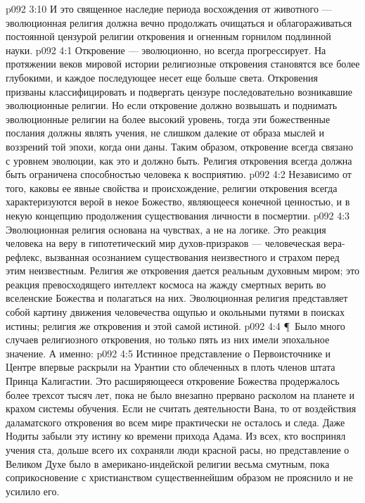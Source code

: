 \vs p092 3:10 И это священное наследие периода восхождения от животного --- эволюционная религия должна вечно продолжать очищаться и облагораживаться постоянной цензурой религии откровения и огненным горнилом подлинной науки.
\vs p092 4:1 Откровение --- эволюционно, но всегда прогрессирует. На протяжении веков мировой истории религиозные откровения становятся все более глубокими, и каждое последующее несет еще больше света. Откровения призваны классифицировать и подвергать цензуре последовательно возникавшие эволюционные религии. Но если откровение должно возвышать и поднимать эволюционные религии на более высокий уровень, тогда эти божественные послания должны являть учения, не слишком далекие от образа мыслей и воззрений той эпохи, когда они даны. Таким образом, откровение всегда связано с уровнем эволюции, как это и должно быть. Религия откровения всегда должна быть ограничена способностью человека к восприятию.
\vs p092 4:2 Независимо от того, каковы ее явные свойства и происхождение, религии откровения всегда характеризуются верой в некое Божество, являющееся конечной ценностью, и в некую концепцию продолжения существования личности в посмертии.
\vs p092 4:3 Эволюционная религия основана на чувствах, а не на логике. Это реакция человека на веру в гипотетический мир духов\hyp{}призраков --- человеческая вера\hyp{}рефлекс, вызванная осознанием существования неизвестного и страхом перед этим неизвестным. Религия же откровения дается реальным духовным миром; это реакция превосходящего интеллект космоса на жажду смертных верить во вселенские Божества и полагаться на них. Эволюционная религия представляет собой картину движения человечества ощупью и окольными путями в поисках истины; религия же откровения и  этой самой истиной.
\vs p092 4:4 \P\ Было много случаев религиозного откровения, но только пять из них имели эпохальное значение. А именно:
\vs p092 4:5 \bibnobreakspace {} Истинное представление о Первоисточнике и Центре впервые раскрыли на Урантии сто облеченных в плоть членов штата Принца Калигастии. Это расширяющееся откровение Божества продержалось более трехсот тысяч лет, пока не было внезапно прервано расколом на планете и крахом системы обучения. Если не считать деятельности Вана, то от воздействия даламатского откровения во всем мире практически не осталось и следа. Даже Нодиты забыли эту истину ко времени прихода Адама. Из всех, кто воспринял учения ста, дольше всего их сохраняли люди красной расы, но представление о Великом Духе было в американо\hyp{}индейской религии весьма смутным, пока соприкосновение с христианством существеннейшим образом не прояснило и не усилило его.
